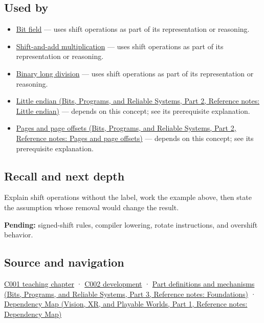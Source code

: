 \subsection{Used by}\label{appendix-73425b25118e-used-by}

\hypertarget{appendix-73425b25118e-used-by}{}

\begin{itemize}
\item
  \hyperref[appendix-ac697f5c66e8]{Bit field} --- uses shift operations as part of its representation or reasoning.
\item
  \hyperref[appendix-a65290d66ed9]{Shift-and-add multiplication} --- uses shift operations as part of its representation or reasoning.
\item
  \hyperref[appendix-89985e6a2685]{Binary long division} --- uses shift operations as part of its representation or reasoning.
\item
  \href{../01-Bits-Programs-and-Reliable-Systems-P02/main.pdf\#nameddest=appendix-367b6abf460e}{Little endian (Bits, Programs, and Reliable Systems, Part 2, Reference notes: Little endian)} --- depends on this concept; see its prerequisite explanation.
\item
  \href{../01-Bits-Programs-and-Reliable-Systems-P02/main.pdf\#nameddest=appendix-0c67cd5bf30a}{Pages and page offsets (Bits, Programs, and Reliable Systems, Part 2, Reference notes: Pages and page offsets)} --- depends on this concept; see its prerequisite explanation.
\end{itemize}

\subsection{Recall and next depth}\label{appendix-73425b25118e-recall-and-next-depth}

\hypertarget{appendix-73425b25118e-recall-and-next-depth}{}

Explain shift operations without the label, work the example above, then state the assumption whose removal would change the result.

\textbf{Pending:} signed-shift rules, compiler lowering, rotate instructions, and overshift behavior.

\subsection{Source and navigation}\label{appendix-73425b25118e-source-and-navigation}

\hypertarget{appendix-73425b25118e-source-and-navigation}{}

\hyperref[01-foundations-i-ch001-from-a-signal-to-an-interpretation]{C001 teaching chapter} · \hyperref[01-foundations-i-ch001-arithmetic-becomes-a-policy]{C002 development} · \href{../01-Bits-Programs-and-Reliable-Systems-P03/main.pdf\#nameddest=appendix-fd090d982a15}{Part definitions and mechanisms (Bits, Programs, and Reliable Systems, Part 3, Reference notes: Foundations)} · \href{../07-Vision-XR-and-Playable-Worlds-P01/main.pdf\#nameddest=appendix-4ad47bdd269a}{Dependency Map (Vision, XR, and Playable Worlds, Part 1, Reference notes: Dependency Map)}
